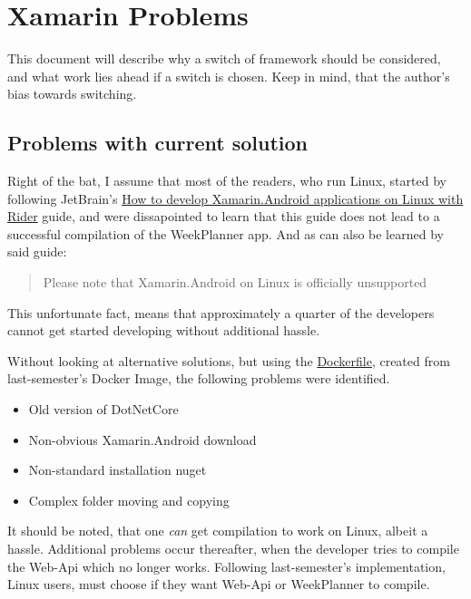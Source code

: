 \chapter{Xamarin Problems} \label{app:xamarin-probelms}

This document will describe why a switch of framework should be considered, and what work lies ahead if a switch is chosen. Keep in mind, that the author's bias towards switching.

\section{Problems with current solution}

Right of the bat, I assume that most of the readers, who run Linux, started by following JetBrain's \href{https://rider-support.jetbrains.com/hc/en-us/articles/360000557259}{How to develop Xamarin.Android applications on Linux with Rider} guide, and were dissapointed to learn that this guide does not lead to a successful compilation of the WeekPlanner app. And as can also be learned by said guide:

\begin{quote}
    Please note that Xamarin.Android on Linux is officially unsupported
\end{quote}

This unfortunate fact, means that approximately a quarter of the developers cannot get started developing without additional hassle.

Without looking at alternative solutions, but using the \href{https://github.com/aau-giraf/xamarin-android/blob/master/Dockerfile}{Dockerfile}, created from last-semester's Docker Image, the following problems were
identified.

\begin{itemize}
    \item Old version of DotNetCore
    \item Non-obvious Xamarin.Android download
    \item Non-standard installation nuget
    \item Complex folder moving and copying
\end{itemize}

It should be noted, that one \emph{can} get compilation to work on
Linux, albeit a hassle. Additional problems occur thereafter, when the
developer tries to compile the Web-Api which no longer works. Following
last-semester's implementation, Linux users, must choose if they want
Web-Api or WeekPlanner to compile.

